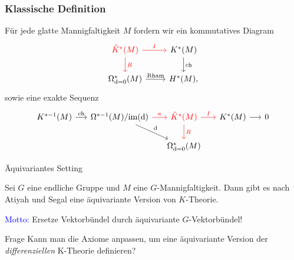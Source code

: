 \documentclass[12pt,utf8,notheorems,compress,t]{beamer}
\renewcommand{\_}{\mathpunct{.}}
\newcommand{\?}{\,{:}\,}
\newcommand{\dd}{\textup{d}}
\begin{document}
\begin{frame}\frametitle{Klassische Definition}
Für jede glatte Mannigfaltigkeit $M$ fordern wir ein kommutatives Diagram
\begin{equation}\begin{tikzcd}[ampersand replacement=\&]
        \textcolor{red}{\hat K^*(M)} \arrow[d,
        "R", red]\arrow[r, "I", red] \& K^*(M)\arrow[d, "\mathrm{ch}"] \\ 
        \Omega^*_{\dd=0}(M) \arrow[r, "\mathrm{Rham}"]\& H^*(M),
\end{tikzcd}\nonumber
\end{equation} \vspace{1em} sowie eine exakte Sequenz\vspace{-2em}
\begin{equation}\begin{tikzcd}[ampersand replacement=\&]
        K^{*-1}(M)\arrow[r, "\mathrm{ch}"]\&[-10pt]\Omega^{*-1}(M) /
        \mathrm{im}(\dd)\ar[dr, "\dd"]\arrow[r, "a", red] \&[-10pt]
        \textcolor{red}{\hat K^*(M)} \arrow[r, "I", red]\ar[d, "R", red]
        \&[-10pt] K^*(M) \arrow[r] \&[-10pt]  0 \\ \&\& \Omega^*_{\dd=0}(M)\&\&
\end{tikzcd}\nonumber
\end{equation}
\end{frame}
\begin{frame}{Äquivariantes Setting}

    Sei $G$ eine endliche Gruppe und $M$ eine $G$-Mannigfaltigkeit. Dann gibt es
    nach Atiyah und Segal eine äquivariante Version von $K$-Theorie.
    
    \textcolor{blue}{Motto:} Ersetze Vektorbündel durch äquivariante
    $G$-Vektorbündel!
    \vspace{1em}
    \begin{block}{Frage}
        Kann man die Axiome anpassen, um eine äquivariante Version der 
        \emph{differenziellen} K-Theorie definieren?
    \end{block}
\end{frame}
\end{document}
